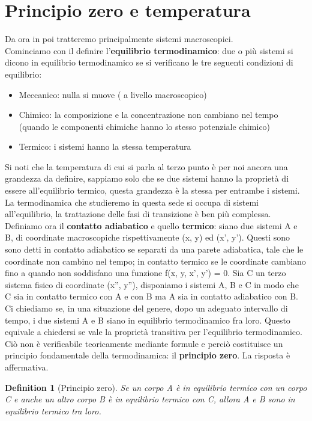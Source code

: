 \documentclass[10pt,a4paper]{article}
\newtheorem{definition}{Definition}
\begin{document}
\section{Principio zero e temperatura}
Da ora in poi tratteremo principalmente sistemi macroscopici.\\
Cominciamo con il definire l'\textbf{equilibrio termodinamico}: due o più sistemi si dicono in equilibrio termodinamico se si verificano le tre seguenti condizioni di equilibrio:
\begin{itemize}
	\item Meccanico: nulla si muove ( a livello macroscopico)
	\item Chimico: la composizione e la concentrazione non cambiano nel tempo (quando le componenti chimiche hanno lo stesso potenziale chimico)
	\item Termico: i sistemi hanno la stessa temperatura
\end{itemize}	
Si noti che la temperatura di cui si parla al terzo punto è per noi ancora una grandezza da definire, sappiamo solo che se due sistemi hanno la proprietà di essere all'equilibrio termico, questa grandezza è la stessa per entrambe i sistemi. La termodinamica che studieremo in questa sede si occupa di sistemi all'equilibrio, la trattazione delle fasi di transizione è ben più complessa.\\
Definiamo ora il \textbf{contatto adiabatico} e quello \textbf{termico}: siano due sistemi A e B, di coordinate macroscopiche rispettivamente (x, y) ed (x', y'). Questi sono sono detti in contatto adiabatico se separati da una parete adiabatica, tale che le coordinate non cambino nel tempo; in contatto termico se le coordinate cambiano fino a quando non soddisfano una funzione f(x, y, x', y') = 0. Sia C un terzo sistema fisico di coordinate (x'', y''), disponiamo i sistemi A, B e C in modo che C sia in contatto termico con A e con B ma A sia in contatto adiabatico con B. Ci chiediamo se, in una situazione del genere, dopo un adeguato intervallo di tempo, i due sistemi A e B siano in equilibrio termodinamico fra loro. Questo equivale a chiedersi se vale la proprietà transitiva per l'equilibrio termodinamico. Ciò non è verificabile teoricamente mediante formule e perciò costituisce un principio fondamentale della termodinamica: il \textbf{principio zero}. La risposta è affermativa.
\begin{definition}[Principio zero]
Se un corpo A è in equilibrio termico con un corpo C e anche un altro corpo B è in equilibrio termico con C, allora A e B sono in equilibrio termico tra loro.
\end{definition}
\end{document}
